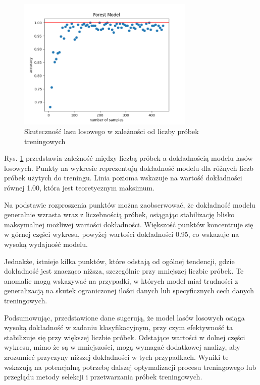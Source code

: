 \documentclass{article}
\begin{document}
\begin{figure}[H]
    \centering
    \includegraphics[width=0.75\textwidth]{transfer_labelling_forest.png}
    \caption{Skuteczność lasu losowego w zależności od liczby próbek treningowych}
    \label{fig:data_chart1}
\end{figure}

Rys. \ref{fig:data_chart1} przedstawia zależność między liczbą próbek a dokładnością modelu lasów losowych. Punkty na wykresie reprezentują dokładność modelu dla różnych liczb próbek użytych do treningu. Linia pozioma wskazuje na wartość dokładności równej 1.00, która jest teoretycznym maksimum.

Na podstawie rozproszenia punktów można zaobserwować, że dokładność modelu generalnie wzrasta wraz z liczebnością próbek, osiągając stabilizację blisko maksymalnej możliwej wartości dokładności. Większość punktów koncentruje się w górnej części wykresu, powyżej wartości dokładności 0.95, co wskazuje na wysoką wydajność modelu.

Jednakże, istnieje kilka punktów, które odstają od ogólnej tendencji, gdzie dokładność jest znacząco niższa, szczególnie przy mniejszej liczbie próbek. Te anomalie mogą wskazywać na przypadki, w których model miał trudności z generalizacją na skutek ograniczonej ilości danych lub specyficznych cech danych treningowych.

Podsumowując, przedstawione dane sugerują, że model lasów losowych osiąga wysoką dokładność w zadaniu klasyfikacyjnym, przy czym efektywność ta stabilizuje się przy większej liczbie próbek. Odstające wartości w dolnej części wykresu, mimo że są w mniejszości, mogą wymagać dodatkowej analizy, aby zrozumieć przyczyny niższej dokładności w tych przypadkach. Wyniki te wskazują na potencjalną potrzebę dalszej optymalizacji procesu treningowego lub przeglądu metody selekcji i przetwarzania próbek treningowych.
\newpage
\end{document}
